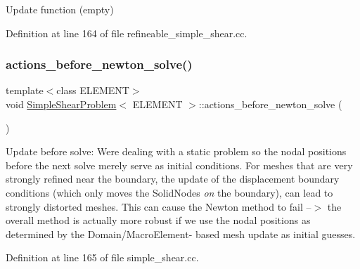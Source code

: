 Update function (empty) 



Definition at line 164 of file refineable\+\_\+simple\+\_\+shear.\+cc.

\mbox{\label{classSimpleShearProblem_a2c63e1a6c120da147b0c4ec9764e1510}} 
\subsubsection{\texorpdfstring{actions\+\_\+before\+\_\+newton\+\_\+solve()}{actions\_before\_newton\_solve()}\hspace{0.1cm}{\footnotesize\ttfamily [1/2]}}
{\footnotesize\ttfamily template$<$class E\+L\+E\+M\+E\+NT$>$ \\
void \hyperlink{classSimpleShearProblem}{Simple\+Shear\+Problem}$<$ E\+L\+E\+M\+E\+NT $>$\+::actions\+\_\+before\+\_\+newton\+\_\+solve (\begin{DoxyParamCaption}{ }\end{DoxyParamCaption})\hspace{0.3cm}{\ttfamily [inline]}}



Update before solve\+: We\textquotesingle{}re dealing with a static problem so the nodal positions before the next solve merely serve as initial conditions. For meshes that are very strongly refined near the boundary, the update of the displacement boundary conditions (which only moves the Solid\+Nodes {\itshape on} the boundary), can lead to strongly distorted meshes. This can cause the Newton method to fail --$>$ the overall method is actually more robust if we use the nodal positions as determined by the Domain/\+Macro\+Element-\/ based mesh update as initial guesses. 



Definition at line 165 of file simple\+\_\+shear.\+cc.

\mbox{\label{classSimpleShearProblem_a2c63e1a6c120da147b0c4ec9764e1510}} 
